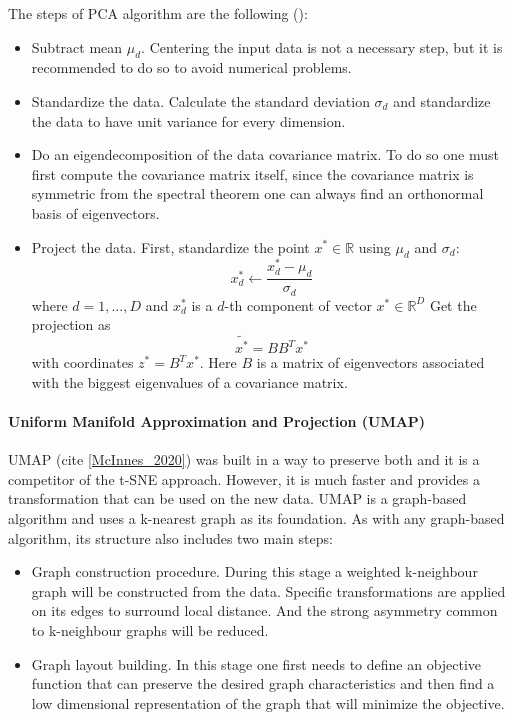 The steps of PCA algorithm are the following (\cite{mml_book}):
\begin{itemize}
    \item Subtract mean $\mu_d$. Centering the input data is not a necessary step, but it is recommended to do so to avoid numerical problems.
    \item Standardize the data. Calculate the standard deviation $\sigma_d$ and standardize the data to have unit variance for every dimension. 
    \item Do an eigendecomposition of the data covariance matrix. To do so one must first compute the covariance matrix itself, since the covariance matrix is symmetric from the spectral theorem one can always find an orthonormal basis of eigenvectors. 
    \item Project the data. First, standardize the point $x^* \in \mathbb{R}$ using $\mu_d$ and $\sigma_d$:
        \begin{equation}
            x^*_d  \leftarrow \frac{x^*_d - \mu_d}{\sigma_d}
        \end{equation}
        where $d = 1, ..., D$ and $x^*_d$ is a $d$-th component of vector $x^* \in \mathbb{R}^D$
    Get the projection as 
    \begin{equation}
        \tilde{x^*} = BB^T x^*
    \end{equation}
    with coordinates $z^* = B^Tx^*$. Here $B$ is a matrix of eigenvectors associated with the biggest eigenvalues of a covariance matrix.
\end{itemize}

\paragraph{Uniform Manifold Approximation and Projection (UMAP)}
UMAP (cite \ref{McInnes_2020}) was built in a way to preserve both and it is a competitor of the t-SNE approach. However, it is much faster and provides a transformation that can be used on the new data. UMAP is a graph-based algorithm and uses a k-nearest graph as its foundation. As with any graph-based algorithm, its structure also includes two main steps: 

\begin{itemize}
    \item Graph construction procedure. During this stage a weighted k-neighbour graph will be constructed from the data. Specific transformations are applied on its edges to surround local distance. And the strong asymmetry common to k-neighbour graphs will be reduced.
    \item Graph layout building. In this stage one first needs to define an objective function that can preserve the desired graph characteristics and then find a low dimensional representation of the graph that will minimize the objective.
\end{itemize}

